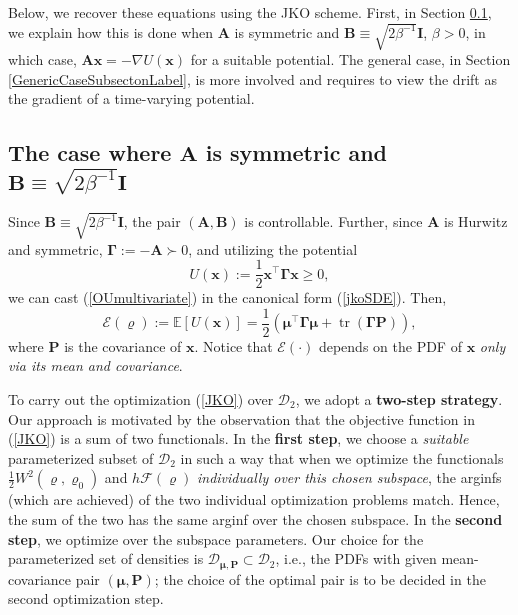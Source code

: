 \documentclass[letterpaper,10pt,twocolumn,conference]{ieeeconf}
\newcommand{\cD}{{\mathscr{D}}}
\newcommand{\bbx}{{\bm{x}}}
\newcommand{\bbA}{\bm{A}}
\newcommand{\tr}{\operatorname{tr}}
\begin{document}
Below, we recover these equations using the JKO scheme. First, in Section \ref{SpecialCaseSubsectonLabel}, we explain how this is done when $\bbA$ is symmetric and $\bm{B}\equiv \sqrt{2\beta^{-1}}\bm{I}$, $\beta>0$, in which case, $\bbA \bbx=-\nabla U(\bbx)$ for a suitable potential.
The general case, in Section \ref{GenericCaseSubsectonLabel}, is more involved and requires to view the drift as the gradient of a time-varying potential.







\subsection{The case where $\bbA$ is symmetric and $\bm{B}\equiv \sqrt{2\beta^{-1}}\bm{I}$}\label{SpecialCaseSubsectonLabel}

Since $\bm{B}\equiv \sqrt{2\beta^{-1}}\bm{I}$, the pair $(\bm{A},\bm{B})$ is controllable. Further, since $\bm{A}$ is Hurwitz and symmetric, $\bm{\Gamma}:=-\bm{A} \succ 0$, and utilizing the potential
\[
U(\bm{x}):=\frac{1}{2}\bm{x}^{\top}\bm{\Gamma}\bm{x} \geq 0,
\]
we can cast (\ref{OUmultivariate}) in the canonical form (\ref{jkoSDE}). Then,
\[
\mathcal{E}(\varrho) := \mathbb{E}[U(\bm{x})] = \frac{1}{2}\left(\bm{\mu}^{\top}\bm{\Gamma}\bm{\mu} + \tr\left(\bm{\Gamma}\bm{P}\right)\right),
\]
where $\bm{P}$ is the covariance of $\bbx$. Notice that $\mathcal{E}(\cdot)$ depends on the PDF of $\bbx$ {\em only via its mean and covariance}.

To carry out the optimization (\ref{JKO}) over $\cD_{2}$, we adopt a \textbf{two-step strategy}. Our approach is motivated by the observation that the objective function in (\ref{JKO}) is a sum of two functionals. In the \textbf{first step}, we choose a {\em suitable} parameterized subset of $\cD_{2}$ in such a way that when we optimize the functionals $\frac{1}{2}W^{2}(\varrho,\varrho_{0})$ and $h\mathcal{F}(\varrho)$ {\em individually over this chosen subspace}, the arginfs (which are achieved) of the two individual optimization problems match.
Hence, the sum of the two has the same arginf over the chosen subspace. In the \textbf{second step}, we optimize over the subspace parameters.
Our choice for the parameterized set of densities is $\cD_{\bm{\mu},\bm{P}} \subset \cD_{2}$, i.e., the PDFs with given mean-covariance pair $(\bm{\mu},\bm{P})$; the choice of the optimal pair is to be decided in the second optimization step.
\end{document}

